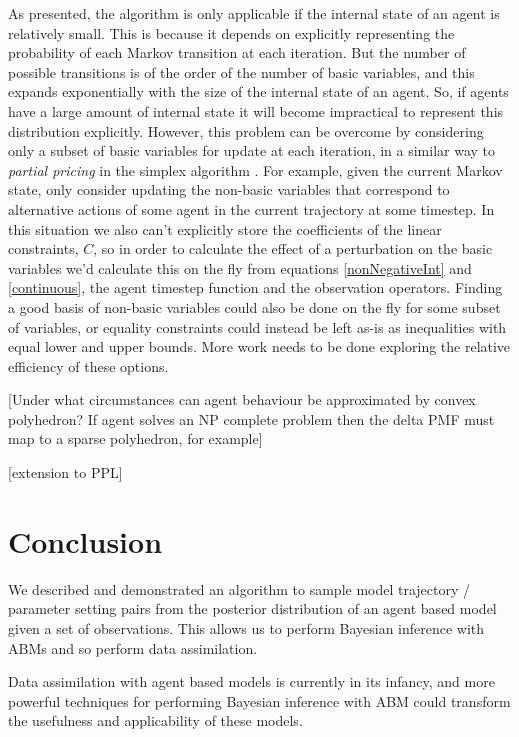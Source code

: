 \documentclass{article}
\begin{document}
As presented, the algorithm is only applicable if the internal state of an agent is relatively small. This is because it depends on explicitly representing the probability of each Markov transition at each iteration. But the number of possible transitions is of the order of the number of basic variables, and this expands exponentially with the size of the internal state of an agent. So, if agents have a large amount of internal state it will become impractical to represent this distribution explicitly. However, this problem can be overcome by considering only a subset of basic variables for update at each iteration, in a similar way to \textit{partial pricing} in the simplex algorithm \citep{maros2002computational}. For example, given the current Markov state, only consider updating the non-basic variables that correspond to alternative actions of some agent in the current trajectory at some timestep. In this situation we also can't explicitly store the coefficients of the linear constraints, $C$, so in order to calculate the effect of a perturbation on the basic variables we'd calculate this on the fly from equations \eqref{nonNegativeInt} and \eqref{continuous}, the agent timestep function and the observation operators. Finding a good basis of non-basic variables could also be done on the fly for some subset of variables, or equality constraints could instead be left as-is as inequalities with equal lower and upper bounds. More work needs to be done exploring the relative efficiency of these options.

[Under what circumstances can agent behaviour be approximated by convex polyhedron? If agent solves an NP complete problem then the delta PMF must map to a sparse polyhedron, for example]

[extension to PPL]

\section{Conclusion}

We described and demonstrated an algorithm to sample model trajectory / parameter setting pairs from the posterior distribution of an agent based model given a set of observations. This allows us to  perform Bayesian inference with ABMs and so perform data assimilation.

Data assimilation with agent based models is currently in its infancy, and more powerful techniques for performing Bayesian inference with ABM could transform the usefulness and applicability of these models.


%
% 


\end{document}

